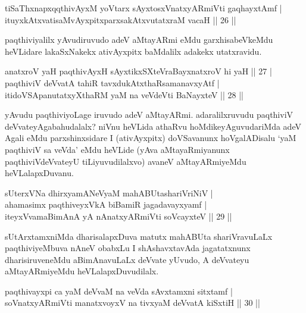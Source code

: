 \begin{shl}
tiSaThxnapxqqthivAyxM yoV\s tarx sAyxtosxV\s natxyARmiVti  gaqhayxtAmf |\\
ituyxkAtxvatisaMvAyxpitxparxsakAtxvutatxraM vacaH \hfill || 26 ||
\end{shl}

\begin{artha}
paqthiviyalilx yAvudiruvudo adeV aMtayARmi eMdu garxhisabeVkeMdu heVLidare lakaSxNakekx ativAyxpitx baMdalilx adakekx utatxravidu.
\end{artha}


\begin{shl}
anatxroV yaH paqthivAyxH sAyxtikxSXteVraBayxnatxroV hi yaH \hfill || 27 |\\
paqthiviV deVvatA tahiR tavxdukAtxthaRsamanavxyAtf |\\
itidoVSApanutatxyXthaRM yaM na veVdeVti BaNayxteV \hfill || 28 ||
\end{shl}

\begin{artha}
yAvudu paqthiviyoLage iruvudo adeV aMtayARmi. adaralilxruvudu paqthiviV deVvateyAgabahudalalx? niVnu heVLida athaRvu hoMdikeyAguvudariMda adeV Agali eMdu parxshinxsidare I (ativAyxpitx) doVSavanunx hoVgalADisalu `yaM paqthiviV sa veVda' eMdu heVLide (yAva aMtayaRmiyanunx paqthiviVdeVvateyU tiLiyuvudilalxvo) avaneV aMtayARmiyeMdu heVLalapxDuvanu.
\end{artha}

\begin{shl}
sUterxVNa dhirxyamANeVyaM mahABUtashariVriNiV |\\
ahamasimx paqthiveyxVkA biBamiR jagadavayxyamf  |\\ 
iteyxVvamaBimAnA yA nAnatxyARmiVti soVcayxteV \hfill || 29 ||
\end{shl}

\begin{artha}
sUtArxtamxniMda dharisalapxDuva matutx mahABUta shariVravuLaLx paqthiviyeMbuva nAneV obabxLu I shAshavxtavAda jagatatxnunx dharisiruveneMdu aBimAnavuLaLx deVvate yUvudo, A deVvateyu aMtayARmiyeMdu heVLalapxDuvudilalx.
\end{artha}

\begin{shl}
paqthivayxpi ca yaM deVvaM na veVda sAvxtamxni sitxtamf |\\
soV\s natxyARmiVti manatxvoyxV na tivxyaM deVvatA kiSxtiH \hfill || 30 ||
\end{shl}

